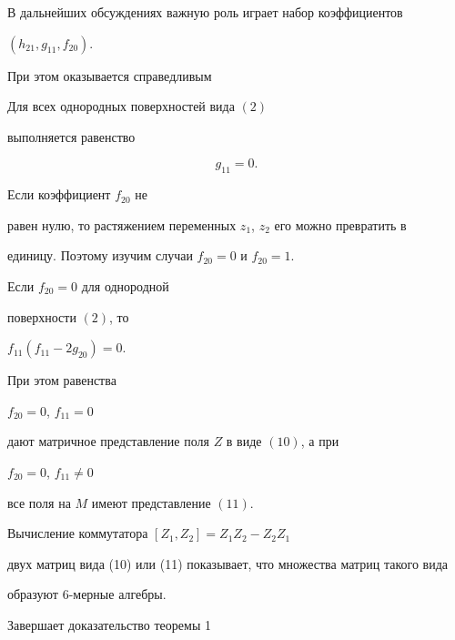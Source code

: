В дальнейших обсуждениях важную роль играет набор коэффициентов


$ ( h_{21}, g_{11}, f_{20} )$.


При этом оказывается справедливым





\begin{prop}


Для всех однородных поверхностей вида $(2)$ 


выполняется равенство 


$$


 g_{11} = 0 .


$$


\end{prop}





Если коэффициент $ f_{20} $ не 


равен нулю, то растяжением переменных $ z_1$, $z_2 $ его можно превратить в 


единицу. Поэтому изучим случаи $ f_{20} = 0 $ и $ f_{20} = 1 $.





\begin{prop}


Если $ f_{20} = 0 $ для однородной 


поверхности $(2)$, то 


$f_{11} (f_{11} - 2 g_{20} ) = 0$.


При этом равенства 


$ f_{20} = 0$, $f_{11} = 0$ 


дают матричное представление поля $ Z $ в виде $(10)$, а при 


$ f_{20} = 0$, $f_{11} \ne 0 $ 


все поля на $ M $ имеют представление $(11)$.


\end{prop}


 





 Вычисление коммутатора $ [Z_1, Z_2] = Z_1 Z_2 - Z_2 Z_1 $ 


двух матриц вида (10) или (11) показывает, что множества матриц такого вида 


образуют 6-мерные алгебры. 





Завершает доказательство теоремы 1





